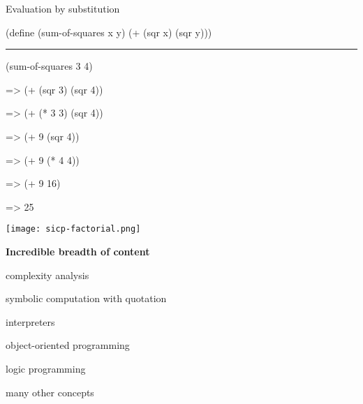 \begin{frame}[fragile]
Evaluation by substitution

\begin{schemecode}
(define (sum-of-squares x y)
  (+ (sqr x) (sqr y)))
\end{schemecode}

\nl
\hrule
\pnl

\begin{schemecode}
     (sum-of-squares 3 4)
\end{schemecode}
\pause
\begin{schemecode}
=>   (+ (sqr 3) (sqr 4))
\end{schemecode}
\pause
\begin{schemecode}
=>   (+ (* 3 3) (sqr 4))
\end{schemecode}
\pause
\begin{schemecode}
=>   (+ 9 (sqr 4))
\end{schemecode}
\pause
\begin{schemecode}
=>   (+ 9 (* 4 4))
\end{schemecode}
\pause
\begin{schemecode}
=>   (+ 9 16)
\end{schemecode}
\pause
\begin{schemecode}
=>   25
\end{schemecode}
\end{frame}


\begin{frame}
\centering
\texttt{[image: sicp-factorial.png]}
\end{frame}


\begin{frame}

\begin{center}
{\bf Incredible breadth of content}
\end{center}
\begin{center} complexity analysis \end{center}
\begin{center} symbolic computation with quotation \end{center}
\begin{center} interpreters \end{center}
\begin{center} object-oriented programming \end{center}
\begin{center} logic programming \end{center}
\begin{center} many other concepts \end{center}
\end{frame}

